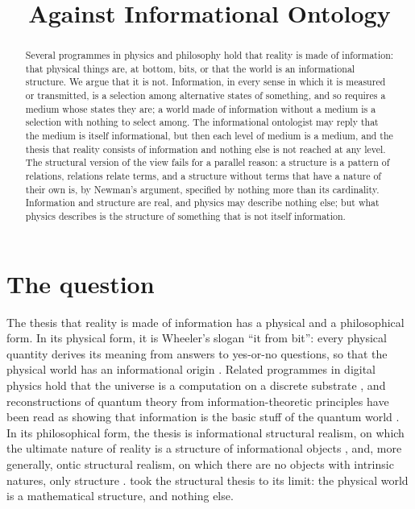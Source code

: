 \documentclass{situationist-preprint}
\title{Against Informational Ontology}
\begin{document}
\maketitle

\begin{abstract}
Several programmes in physics and philosophy hold that reality is made of information: that physical things are, at bottom, bits, or that the world is an informational structure. We argue that it is not. Information, in every sense in which it is measured or transmitted, is a selection among alternative states of something, and so requires a medium whose states they are; a world made of information without a medium is a selection with nothing to select among. The informational ontologist may reply that the medium is itself informational, but then each level of medium is a medium, and the thesis that reality consists of information and nothing else is not reached at any level. The structural version of the view fails for a parallel reason: a structure is a pattern of relations, relations relate terms, and a structure without terms that have a nature of their own is, by Newman's argument, specified by nothing more than its cardinality. Information and structure are real, and physics may describe nothing else; but what physics describes is the structure of something that is not itself information.
\end{abstract}

\section{The question}\label{s:question}

The thesis that reality is made of information has a physical and a philosophical form. In its physical form, it is Wheeler's slogan \enquote{it from bit}: every physical quantity derives its meaning from answers to yes-or-no questions, so that the physical world has an informational origin \citep{Wheeler1990}. Related programmes in digital physics hold that the universe is a computation on a discrete substrate \citep{Zuse1969,Fredkin2003}, and reconstructions of quantum theory from information-theoretic principles have been read as showing that information is the basic stuff of the quantum world \citep{CliftonBubHalvorson2003}. In its philosophical form, the thesis is informational structural realism, on which the ultimate nature of reality is a structure of informational objects \citep{Floridi2008,Floridi2011}, and, more generally, ontic structural realism, on which there are no objects with intrinsic natures, only structure \citep{LadymanRoss2007,French2014}. \citet{Tegmark2008} took the structural thesis to its limit: the physical world is a mathematical structure, and nothing else.
\end{document}
